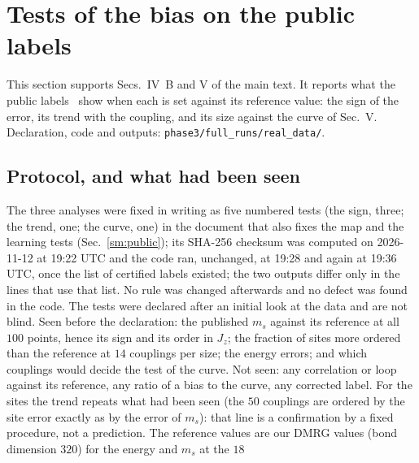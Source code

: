 \documentclass[aps,prx,onecolumn,10pt,nofootinbib,longbibliography,floatfix]{revtex4-2}
\theoremstyle{remark}
\newcommand{\Jz}{J_z}
\newcommand{\ms}{m_s}
\begin{document}
\section{Tests of the bias on the public labels}
\label{sm:publictests}

This section supports Secs.~IV~B and V of the main text. It reports what the public labels~\cite{jaderberg2026data}
show when each is set against its reference value: the sign of the error, its trend with the coupling, and its size
against the curve of Sec.~V. Declaration, code and outputs: \texttt{phase3/full\_runs/real\_data/}.

\subsection{Protocol, and what had been seen}
The three analyses were fixed in writing as five numbered tests (the sign, three; the trend, one; the curve, one) in
the document that also fixes the map and the learning tests (Sec.~\ref{sm:public}); its SHA-256 checksum was computed %
on 2026-11-12 at 19:22 UTC and the code ran, unchanged, at 19:28 and again at 19:36 UTC, once the list of certified %
labels existed; the two outputs differ only in the lines that use that list. No rule was changed afterwards and no
defect was found in the code. The tests were declared after an initial look at the data and are not blind. Seen
before the declaration: the published $\ms$ against its reference at all $100$ points, hence its sign and its order in %
$\Jz$; the fraction of sites more ordered than the reference at $14$ couplings per size; the energy errors; and which %
couplings would decide the test of the curve. Not seen: any correlation or loop against its reference, any ratio of
a bias to the curve, any corrected label. For the sites the trend repeats what had been seen (the $50$ couplings are %
ordered by the site error exactly as by the error of $\ms$): that line is a confirmation by a fixed procedure, not a
prediction. The reference values are our DMRG values (bond dimension $320$) for the energy and $\ms$ at the $18$ %
\end{document}
